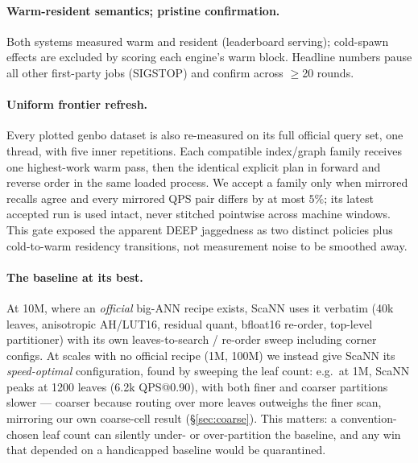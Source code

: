 \documentclass{article}
\begin{document}
\paragraph{Warm-resident semantics; pristine confirmation.} Both systems measured
warm and resident (leaderboard serving); cold-spawn effects are excluded
by scoring each engine's warm block. Headline numbers pause all other first-party
jobs (SIGSTOP) and confirm across $\ge$20 rounds.

\paragraph{Uniform frontier refresh.} Every plotted genbo dataset is also
re-measured on its full official query set, one thread, with five inner
repetitions. Each compatible index/graph family receives one highest-work warm
pass, then the identical explicit plan in forward and reverse order in the same
loaded process. We accept a family only when mirrored recalls agree and every
mirrored QPS pair differs by at most $5\%$; its latest accepted run is used intact,
never stitched pointwise across machine windows. This gate exposed the apparent
DEEP jaggedness as two distinct policies plus cold-to-warm residency transitions,
not measurement noise to be smoothed away.

\paragraph{The baseline at its best.} At 10M, where an \emph{official} big-ANN recipe
exists, ScaNN uses it verbatim (40k leaves, anisotropic AH/LUT16, residual quant,
bfloat16 re-order, top-level partitioner) with its own leaves-to-search / re-order
sweep including corner configs. At scales with no official recipe (1M, 100M) we
instead give ScaNN its \emph{speed-optimal} configuration, found by sweeping the leaf
count: e.g.\ at 1M, ScaNN peaks at 1200 leaves (6.2k QPS@0.90), with both finer and
coarser partitions slower --- coarser because routing over more leaves outweighs the
finer scan, mirroring our own coarse-cell result (\S\ref{sec:coarse}). This matters:
a convention-chosen leaf count can silently under- or over-partition the baseline,
and any win that depended on a handicapped baseline would be quarantined.
\end{document}
